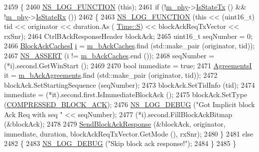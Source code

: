 \begin{DoxyCode}
2459 \{
2460   \hyperlink{log-macros-disabled_8h_a90b90d5bad1f39cb1b64923ea94c0761}{NS\_LOG\_FUNCTION} (\textcolor{keyword}{this});
2461   \textcolor{keywordflow}{if} (!\hyperlink{classns3_1_1MacLow_aec8aefec9501f9d7c06b6cd0ee1353ee}{m\_phy}->\hyperlink{classns3_1_1WifiPhy_a2bc2591a68dbea15f9ff95fc6722e6c1}{IsStateTx} () && !\hyperlink{classns3_1_1MacLow_aec8aefec9501f9d7c06b6cd0ee1353ee}{m\_phy}->\hyperlink{classns3_1_1WifiPhy_a754ce070e2635c324a0b818b56eb0a4c}{IsStateRx} ())
2462     \{
2463       \hyperlink{log-macros-disabled_8h_a90b90d5bad1f39cb1b64923ea94c0761}{NS\_LOG\_FUNCTION} (\textcolor{keyword}{this} << (uint16\_t) tid << originator << duration.As (
      \hyperlink{classns3_1_1Time_a87a7f4d29c68b047a72d291ad660295aade8622b06524a328cd3a59db6ccf76af}{Time::S}) << blockAckReqTxVector << rxSnr);
2464       CtrlBAckResponseHeader blockAck;
2465       uint16\_t seqNumber = 0;
2466       \hyperlink{classns3_1_1MacLow_ae0b0abf84b6078031fabd4e85e1cb1bf}{BlockAckCachesI} \hyperlink{bernuolliDistribution_8m_a6f6ccfcf58b31cb6412107d9d5281426}{i} = \hyperlink{classns3_1_1MacLow_a1a2b5d95cae95e9b99e6508d7d350b47}{m\_bAckCaches}.find (std::make\_pair (originator, tid));
2467       \hyperlink{assert_8h_a6dccdb0de9b252f60088ce281c49d052}{NS\_ASSERT} (i != \hyperlink{classns3_1_1MacLow_a1a2b5d95cae95e9b99e6508d7d350b47}{m\_bAckCaches}.end ());
2468       seqNumber = (*i).second.GetWinStart ();
2469 
2470       \textcolor{keywordtype}{bool} immediate = \textcolor{keyword}{true};
2471       \hyperlink{classns3_1_1MacLow_a7876cc9b328cdb0508f2a7b7647eab10}{AgreementsI} it = \hyperlink{classns3_1_1MacLow_a53482df1a7e6f136cfa8ce50fa10adc2}{m\_bAckAgreements}.find (std::make\_pair (originator, tid));
2472       blockAck.SetStartingSequence (seqNumber);
2473       blockAck.SetTidInfo (tid);
2474       immediate = (*it).second.first.IsImmediateBlockAck ();
2475       blockAck.SetType (\hyperlink{namespacens3_a90f436472d19d7d7f37cbf0b8c288ff7ad325114ff6e0d84c1d4cea5bd810a48c}{COMPRESSED\_BLOCK\_ACK});
2476       \hyperlink{group__logging_ga413f1886406d49f59a6a0a89b77b4d0a}{NS\_LOG\_DEBUG} (\textcolor{stringliteral}{"Got Implicit block Ack Req with seq "} << seqNumber);
2477       (*i).second.FillBlockAckBitmap (&blockAck);
2478 
2479       \hyperlink{classns3_1_1MacLow_a85c374be43ba3bd52fd1ad6efdfef6c6}{SendBlockAckResponse} (&blockAck, originator, immediate, duration, 
      blockAckReqTxVector.GetMode (), rxSnr);
2480     \}
2481   \textcolor{keywordflow}{else}
2482     \{
2483       \hyperlink{group__logging_ga413f1886406d49f59a6a0a89b77b4d0a}{NS\_LOG\_DEBUG} (\textcolor{stringliteral}{"Skip block ack response!"});
2484     \}
2485 \}
\end{DoxyCode}


